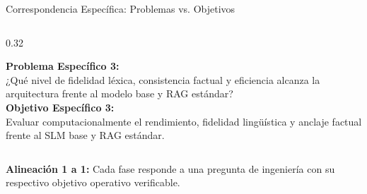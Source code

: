 \documentclass[aspectratio=169, 10pt, spanish]{beamer}
\begin{document}
\begin{frame}{Correspondencia Específica: Problemas vs. Objetivos}
\begin{columns}[T]
        \begin{column}{0.32\textwidth}
            \begin{tcolorbox}[enhanced, colback=white, colframe=bpGreen!80!black, title=\textbf{\scriptsize Nodo 3: Validación Computacional}, arc=1.5mm, left=1.5mm, right=1.5mm, top=1.5mm, bottom=1.5mm]
                \tiny
                \textbf{\color{bpGreen!80!black}Problema Específico 3:}\\
                ¿Qué nivel de fidelidad léxica, consistencia factual y eficiencia alcanza la arquitectura frente al modelo base y RAG estándar?\\[0.15cm]
                \textbf{\color{bpGreen!80!black}Objetivo Específico 3:}\\
                Evaluar computacionalmente el rendimiento, fidelidad lingüística y anclaje factual frente al SLM base y RAG estándar.
            \end{tcolorbox}
        \end{column}
    \end{columns}

    \vspace{0.2cm}
    \begin{tcolorbox}[colback=bpLightGray, colframe=bpNavy, arc=1.2mm, left=2mm, right=2mm, top=1.2mm, bottom=1.2mm]
        \tiny\textbf{\color{bpNavy}Alineación 1 a 1:} Cada fase responde a una pregunta de ingeniería con su respectivo objetivo operativo verificable.
    \end{tcolorbox}
\end{frame}
\end{document}
